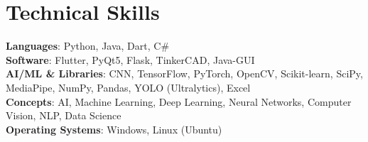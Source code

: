 \section{Technical Skills}
    \begin{itemize}[leftmargin=0.0in, label={}]
	\footnotesize{\item{
		\textbf{Languages}{: Python, Java, Dart, C\#} \\[2pt]
        \textbf{Software}{: Flutter, PyQt5, Flask, TinkerCAD, Java-GUI} \\[2pt]
        \textbf{AI/ML \& Libraries}{: CNN, TensorFlow, PyTorch, OpenCV, Scikit-learn, SciPy, MediaPipe, NumPy, Pandas, YOLO (Ultralytics), Excel} \\[2pt]
		\textbf{Concepts}{: AI, Machine Learning, Deep Learning, Neural Networks, Computer Vision, NLP, Data Science} \\[2pt]
        \textbf{Operating Systems}{: Windows, Linux (Ubuntu)}
	}}
    \end{itemize}\vspace{-6pt}